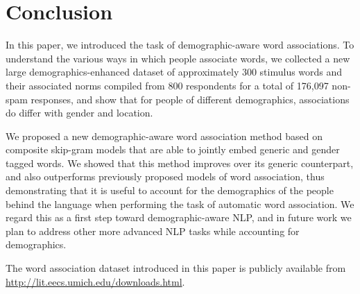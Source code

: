 \documentclass[11pt,letterpaper]{article}
\newcommand{\FIXME}[1]{\textcolor{red}{#1}}
\begin{document}
\section{Conclusion}
In this paper, we introduced the task of demographic-aware word associations. To understand the various ways in which people associate words, we collected a new large demographics-enhanced dataset of approximately 300 stimulus words and their associated norms compiled from 800 respondents for a total of 176,097 non-spam responses, and show that for people of different demographics, associations do differ with gender and location. 

We proposed a new demographic-aware word association method based on composite skip-gram models that are able to jointly embed generic and gender tagged words. We showed that this method improves over its generic counterpart, and also outperforms previously proposed models of word association, 
thus demonstrating that  it is useful to account for the demographics of the people behind the language when performing the task of automatic word association. We regard this as a first step toward demographic-aware NLP, and in future work we plan to address other more advanced NLP tasks while accounting for demographics. 

The word association dataset introduced in this paper is publicly available from \url{http://lit.eecs.umich.edu/downloads.html}. 
\end{document}
